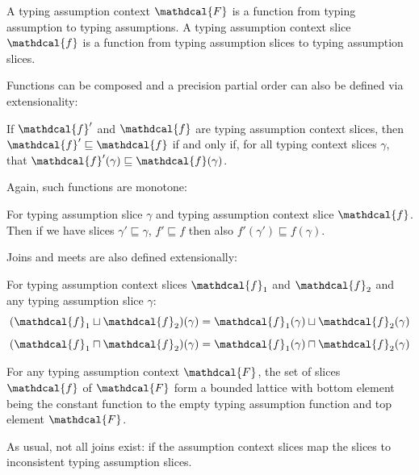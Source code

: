 \newcommand{\F}{\mathdcal{F}}
\newcommand{\f}{\mathdcal{f}}
\begin{definition}
A typing assumption context $\F$ is a function from typing assumption to typing assumptions. A typing assumption context slice $\f$ is a function from typing assumption slices to typing assumption slices.
\end{definition}

Functions can be composed and a precision partial order can also be defined via extensionality:
\begin{definition}\label{def:FunctionPrecision}
If $\f'$ and $\f$ are typing assumption context slices, then $\f' \sqsubseteq \f$ if and only if, for all typing context slices $\gamma$, that $\f'(\gamma) \sqsubseteq \f(\gamma)$.
\end{definition}
Again, such functions are monotone:
\begin{conjecture}
For typing assumption slice $\gamma$ and typing assumption context slice $\f$. Then if we have slices $\gamma' \sqsubseteq \gamma$, $f' \sqsubseteq f$ then also $f'(\gamma') \sqsubseteq f(\gamma)$.
\end{conjecture}
Joins and meets are also defined extensionally:
\begin{definition} For typing assumption context slices $\f_1$ and $\f_2$ and any typing assumption slice $\gamma$:
\[(\f_1 \sqcup \f_2)(\gamma) = \f_1(\gamma) \sqcup \f_2(\gamma)\]
\[(\f_1 \sqcap \f_2)(\gamma) = \f_1(\gamma) \sqcap \f_2(\gamma)\]
\end{definition}

\begin{conjecture}
For any typing assumption context $\F$, the set of slices $\f$ of $\F$ form a bounded lattice with bottom element being the constant function to the empty typing assumption function and top element $\F$.
\end{conjecture}

As usual, not all joins exist: if the assumption context slices map the slices to inconsistent typing assumption slices. 
